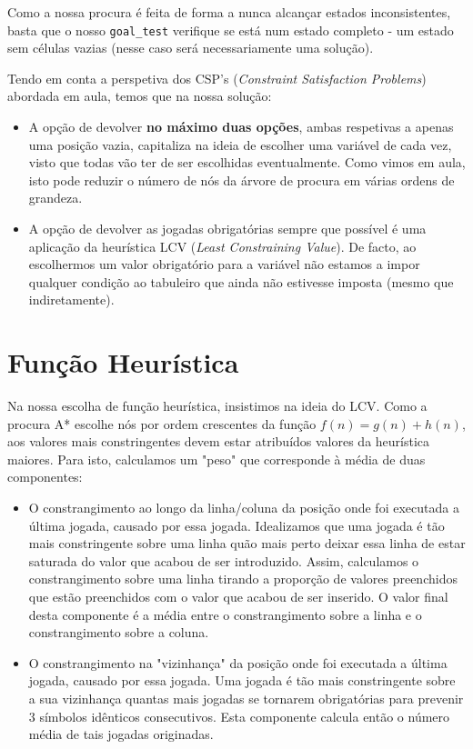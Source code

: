 \documentclass[12pt,a4paper]{article}
\begin{document}
Como a nossa procura é feita de forma a nunca alcançar estados inconsistentes, basta
que o nosso \texttt{goal\_test} verifique se está num estado completo - um estado
sem células vazias (nesse caso será necessariamente uma solução).

Tendo em conta a perspetiva dos CSP's (\textit{Constraint Satisfaction Problems})
abordada em aula, temos que na nossa solução:
\begin{itemize}
      \item A opção de devolver \textbf{no máximo duas opções}, ambas respetivas a apenas uma
            posição vazia, capitaliza na ideia de escolher uma variável de cada vez, visto
            que todas vão ter de ser escolhidas eventualmente.
            Como vimos em aula, isto pode reduzir o número de nós da árvore de procura
            em várias ordens de grandeza.
      \item A opção de devolver as jogadas obrigatórias sempre que possível é uma
            aplicação da heurística LCV (\textit{Least Constraining Value}).
            De facto, ao escolhermos um valor obrigatório para a variável não estamos
            a impor qualquer condição ao tabuleiro que ainda não estivesse imposta
            (mesmo que indiretamente).
\end{itemize}

\section*{Função Heurística}

Na nossa escolha de função heurística, insistimos na ideia do LCV.
Como a procura A* escolhe nós por ordem crescentes da função $f(n) = g(n) + h(n)$, aos valores mais constringentes devem estar atribuídos valores da heurística maiores.
Para isto, calculamos um "peso" que corresponde à média de duas componentes:
\begin{itemize}
      \item O constrangimento ao longo da linha/coluna da posição onde foi executada a última jogada, causado por essa jogada.
        Idealizamos que uma jogada é tão mais constringente sobre uma linha quão mais perto deixar essa linha de estar saturada do valor que acabou de ser introduzido. 
        Assim, calculamos o constrangimento sobre uma linha tirando a proporção de valores preenchidos que estão preenchidos com o valor que acabou de ser inserido.
        O valor final desta componente é a média entre o constrangimento sobre a linha e o constrangimento sobre a coluna.
      \item O constrangimento na "vizinhança" da posição onde foi executada a última jogada, causado por essa jogada.
        Uma jogada é tão mais constringente sobre a sua vizinhança quantas mais jogadas se tornarem obrigatórias para prevenir 3 símbolos idênticos consecutivos.
        Esta componente calcula então o número média de tais jogadas originadas.
\end{itemize}
\end{document}

